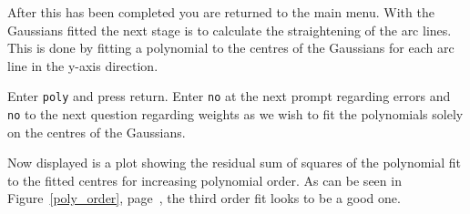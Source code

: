 \documentclass[twoside,11pt]{starlink}
\providecommand{\scspec}[2]{#1}
\begin{document}
After this has been completed you are returned to the main menu. With
the Gaussians fitted the next stage is to calculate the straightening
of the arc lines. This is done by fitting a polynomial to the centres
of the Gaussians for each arc line in the y-axis direction.

Enter \texttt{poly} and press return. Enter \texttt{no} at the next prompt
regarding errors and \texttt{no} to the next question regarding weights
as we wish to fit the polynomials solely on the centres of the
Gaussians.

Now displayed is a plot showing the residual sum of squares of the
polynomial fit to the fitted centres for increasing polynomial order.
As can be seen in \scspec{Figure~\ref{poly_order},
page~\pageref{poly_order},}{the figure below} the third order fit
looks to be a good one.
\end{document}
